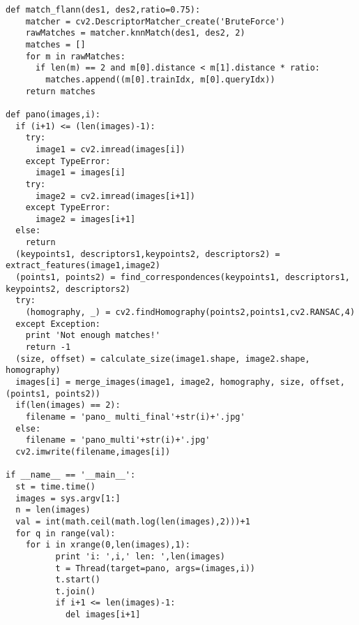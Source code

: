 \begin{lstlisting}
def match_flann(des1, des2,ratio=0.75):
    matcher = cv2.DescriptorMatcher_create('BruteForce')
    rawMatches = matcher.knnMatch(des1, des2, 2)
    matches = []
    for m in rawMatches:
      if len(m) == 2 and m[0].distance < m[1].distance * ratio:
        matches.append((m[0].trainIdx, m[0].queryIdx))
    return matches

def pano(images,i):
  if (i+1) <= (len(images)-1):
    try:
      image1 = cv2.imread(images[i])
    except TypeError:
      image1 = images[i]
    try:
      image2 = cv2.imread(images[i+1])
    except TypeError:
      image2 = images[i+1]
  else:
    return  
  (keypoints1, descriptors1,keypoints2, descriptors2) = extract_features(image1,image2)
  (points1, points2) = find_correspondences(keypoints1, descriptors1, keypoints2, descriptors2)
  try:
    (homography, _) = cv2.findHomography(points2,points1,cv2.RANSAC,4)
  except Exception:
    print 'Not enough matches!'
    return -1
  (size, offset) = calculate_size(image1.shape, image2.shape, homography)
  images[i] = merge_images(image1, image2, homography, size, offset, (points1, points2))
  if(len(images) == 2):
    filename = 'pano_ multi_final'+str(i)+'.jpg'
  else:
    filename = 'pano_multi'+str(i)+'.jpg'
  cv2.imwrite(filename,images[i])
  
if __name__ == '__main__':
  st = time.time()
  images = sys.argv[1:]
  n = len(images)
  val = int(math.ceil(math.log(len(images),2)))+1
  for q in range(val):
    for i in xrange(0,len(images),1):
          print 'i: ',i,' len: ',len(images)
          t = Thread(target=pano, args=(images,i))
          t.start()
          t.join()
          if i+1 <= len(images)-1:
            del images[i+1]
\end{lstlisting}